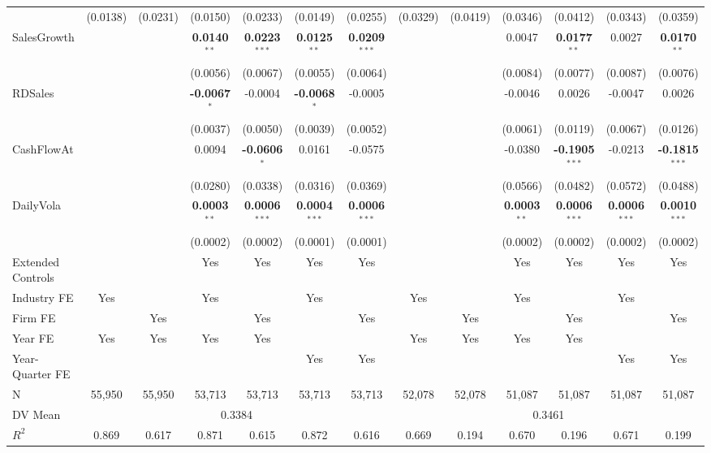 \documentclass[11pt,a4paper]{article}
\begin{document}
\begin{table}[htbp]
\begin{tabular}{lcccccccccccc}
 & (0.0138) & (0.0231) & (0.0150) & (0.0233) & (0.0149) & (0.0255) & (0.0329) & (0.0419) & (0.0346) & (0.0412) & (0.0343) & (0.0359) \\
SalesGrowth &  &  & \textbf{0.0140}$^{**}$ & \textbf{0.0223}$^{***}$ & \textbf{0.0125}$^{**}$ & \textbf{0.0209}$^{***}$ &  &  & 0.0047 & \textbf{0.0177}$^{**}$ & 0.0027 & \textbf{0.0170}$^{**}$ \\
 &  &  & (0.0056) & (0.0067) & (0.0055) & (0.0064) &  &  & (0.0084) & (0.0077) & (0.0087) & (0.0076) \\
RDSales &  &  & \textbf{-0.0067}$^{*}$ & -0.0004 & \textbf{-0.0068}$^{*}$ & -0.0005 &  &  & -0.0046 & 0.0026 & -0.0047 & 0.0026 \\
 &  &  & (0.0037) & (0.0050) & (0.0039) & (0.0052) &  &  & (0.0061) & (0.0119) & (0.0067) & (0.0126) \\
CashFlowAt &  &  & 0.0094 & \textbf{-0.0606}$^{*}$ & 0.0161 & -0.0575 &  &  & -0.0380 & \textbf{-0.1905}$^{***}$ & -0.0213 & \textbf{-0.1815}$^{***}$ \\
 &  &  & (0.0280) & (0.0338) & (0.0316) & (0.0369) &  &  & (0.0566) & (0.0482) & (0.0572) & (0.0488) \\
DailyVola &  &  & \textbf{0.0003}$^{**}$ & \textbf{0.0006}$^{***}$ & \textbf{0.0004}$^{***}$ & \textbf{0.0006}$^{***}$ &  &  & \textbf{0.0003}$^{**}$ & \textbf{0.0006}$^{***}$ & \textbf{0.0006}$^{***}$ & \textbf{0.0010}$^{***}$ \\
 &  &  & (0.0002) & (0.0002) & (0.0001) & (0.0001) &  &  & (0.0002) & (0.0002) & (0.0002) & (0.0002) \\
\midrule
Extended Controls &  &  & Yes & Yes & Yes & Yes &  &  & Yes & Yes & Yes & Yes \\
Industry FE & Yes &  & Yes &  & Yes &  & Yes &  & Yes &  & Yes &  \\
Firm FE &  & Yes &  & Yes &  & Yes &  & Yes &  & Yes &  & Yes \\
Year FE & Yes & Yes & Yes & Yes &  &  & Yes & Yes & Yes & Yes &  &  \\
Year-Quarter FE &  &  &  &  & Yes & Yes &  &  &  &  & Yes & Yes \\
\midrule
N & 55,950 & 55,950 & 53,713 & 53,713 & 53,713 & 53,713 & 52,078 & 52,078 & 51,087 & 51,087 & 51,087 & 51,087 \\
DV Mean & \multicolumn{6}{c}{0.3384} & \multicolumn{6}{c}{0.3461} \\
$R^2$ & 0.869 & 0.617 & 0.871 & 0.615 & 0.872 & 0.616 & 0.669 & 0.194 & 0.670 & 0.196 & 0.671 & 0.199 \\

\end{tabular}
\end{table}
\end{document}
